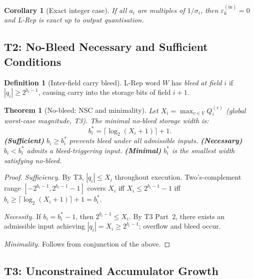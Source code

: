 \documentclass[11pt,a4paper]{article}
\theoremstyle{definition}
\newtheorem{definition}{Definition}[section]
\theoremstyle{plain}
\newtheorem{theorem}{Theorem}[section]
\newtheorem{corollary}{Corollary}[section]
\theoremstyle{remark}
\begin{document}
\begin{corollary}[Exact integer case]
If all $a_i$ are multiples of $1/\sigma_i$, then $\varepsilon_k^{(\mathrm{in})}=0$
and L-Rep is exact up to output quantisation.
\end{corollary}

\subsection{T2: No-Bleed Necessary and Sufficient Conditions}
\label{sec:nobleed}

\begin{definition}[Inter-field carry bleed]
L-Rep word $W$ has \emph{bleed at field $i$} if $|q_i|\ge2^{b_i-1}$,
causing carry into the storage bits of field $i+1$.
\end{definition}

\begin{theorem}[No-bleed: NSC and minimality]
\label{thm:nobleed}
Let $X_i=\max_{v\in V}Q_i^{(v)}$ (global worst-case magnitude, T3).
The minimal no-bleed storage width is:
\begin{equation}\label{eq:nobleed}
  b_i^* = \lceil\log_2(X_i+1)\rceil + 1.
\end{equation}
\textbf{(Sufficient)} $b_i\ge b_i^*$ prevents bleed under all admissible inputs.
\textbf{(Necessary)} $b_i<b_i^*$ admits a bleed-triggering input.
\textbf{(Minimal)} $b_i^*$ is the smallest width satisfying no-bleed.
\end{theorem}

\begin{proof}
\textit{Sufficiency.}
By T3, $|q_i|\le X_i$ throughout execution.
Two's-complement range $[-2^{b_i-1},2^{b_i-1}-1]$ covers $X_i$ iff
$X_i\le2^{b_i-1}-1$ iff $b_i\ge\lceil\log_2(X_i+1)\rceil+1=b_i^*$.

\textit{Necessity.}
If $b_i=b_i^*-1$, then $2^{b_i-1}\le X_i$.
By T3 Part~2, there exists an admissible input achieving $|q_i|=X_i\ge2^{b_i-1}$;
overflow and bleed occur.

\textit{Minimality.} Follows from conjunction of the above.
\end{proof}

\subsection{T3: Unconstrained Accumulator Growth}
\label{sec:growth}
\end{document}
